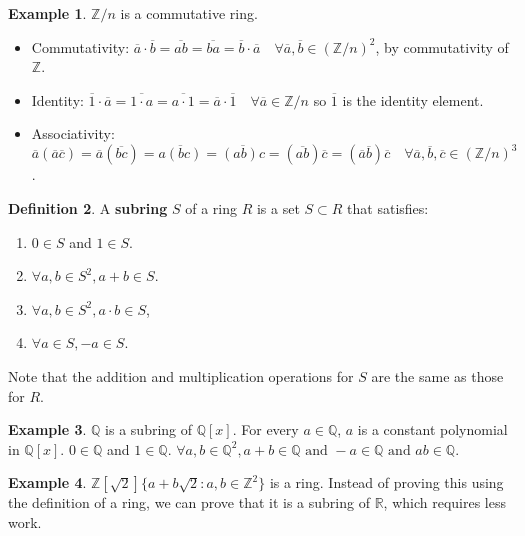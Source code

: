 \documentclass[12pt,a4paper]{article}
\theoremstyle{definition}
\newtheorem{definition}{Definition}[subsection]
\newtheorem{example}[definition]{Example}
\begin{document}
\begin{example}
	$\mathbb{Z} / n$ is a commutative ring.

	\begin{itemize}
		\item Commutativity: $\overline{a} \cdot \overline{b} = \overline{ab} = \overline{ba} = \overline{b} \cdot \overline{a} \quad \forall \overline{a}, \overline{b} \in {(\mathbb{Z} / n)}^2$, by commutativity of $\mathbb{Z}$.
		\item Identity: $\overline{1} \cdot \overline{a} = \overline{1 \cdot a} = \overline{a \cdot 1} = \overline{a} \cdot \overline{1} \quad \forall \overline{a} \in \mathbb{Z} / n$ so $\overline{1}$ is the identity element.
		\item Associativity: $\overline{a} (\overline{a} \overline{c}) = \overline{a} (\overline{bc}) = \overline{a(bc)} = \overline{(ab)c} = (\overline{ab}) \overline{c} = (\overline{a} \overline{b}) \overline{c} \quad \forall \overline{a}, \overline{b}, \overline{c} \in {(\mathbb{Z} / n)}^3$.
	\end{itemize}
\end{example}

\begin{definition}
	A \textbf{subring} $S$ of a ring $R$ is a set $S \subset R$ that satisfies:
	\begin{enumerate}
		\item $0 \in S$ and $1 \in S$.
		\item $\forall a, b \in S^2, a + b \in S$.
		\item $\forall a, b \in S^2, a \cdot b \in S$,
		\item $\forall a \in S, -a \in S$.
	\end{enumerate}
	Note that the addition and multiplication operations for $S$ are the same as those for $R$.
\end{definition}

\begin{example}
	$\mathbb{Q}$ is a subring of $\mathbb{Q}[x]$. For every $a \in \mathbb{Q}$, $a$ is a constant polynomial in $\mathbb{Q}[x]$. $0 \in \mathbb{Q}$ and $1 \in \mathbb{Q}$. $\forall a, b \in \mathbb{Q}^2, a + b \in \mathbb{Q} \text{ and } -a \in \mathbb{Q} \text{ and } ab \in \mathbb{Q}$.
\end{example}

\begin{example}
	$\mathbb{Z}[\sqrt{2}]  \{ a + b \sqrt{2}: a, b \in \mathbb{Z}^2 \}$ is a ring. Instead of proving this using the definition of a ring, we can prove that it is a subring of $\mathbb{R}$, which requires less work.
\end{example}
\end{document}
